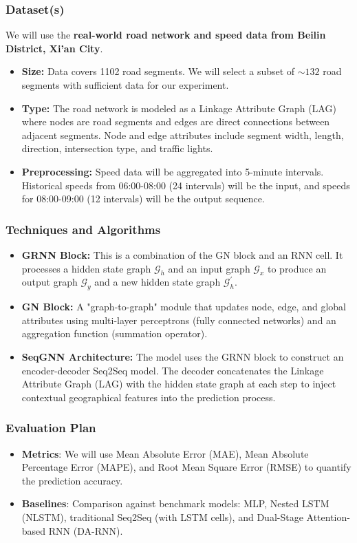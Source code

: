 \documentclass[11pt, a4paper]{article}
\begin{document}
\subsubsection*{Dataset(s)}
We will use the \textbf{real-world road network and speed data from Beilin District, Xi'an City}.
\begin{itemize}
    \item \textbf{Size:} Data covers 1102 road segments. We will select a subset of $\sim 132$ road segments with sufficient data for our experiment.
    \item \textbf{Type:} The road network is modeled as a Linkage Attribute Graph (LAG) where nodes are road segments and edges are direct connections between adjacent segments. Node and edge attributes include segment width, length, direction, intersection type, and traffic lights.
    \item \textbf{Preprocessing:} Speed data will be aggregated into 5-minute intervals. Historical speeds from 06:00-08:00 (24 intervals) will be the input, and speeds for 08:00-09:00 (12 intervals) will be the output sequence.
\end{itemize}

\subsubsection*{Techniques and Algorithms}
\begin{itemize}
    \item \textbf{GRNN Block:} This is a combination of the GN block and an RNN cell. It processes a hidden state graph $\mathcal{G}_{h}$ and an input graph $\mathcal{G}_{x}$ to produce an output graph $\mathcal{G}_{y}$ and a new hidden state graph $\mathcal{G}_{h}^{\prime}$.
    \item \textbf{GN Block:} A "graph-to-graph" module that updates node, edge, and global attributes using multi-layer perceptrons (fully connected networks) and an aggregation function (summation operator).
    \item \textbf{SeqGNN Architecture:} The model uses the GRNN block to construct an encoder-decoder Seq2Seq model. The decoder concatenates the Linkage Attribute Graph (LAG) with the hidden state graph at each step to inject contextual geographical features into the prediction process.
\end{itemize}

\subsubsection*{Evaluation Plan}
\begin{itemize}
    \item \textbf{Metrics}: We will use Mean Absolute Error (MAE), Mean Absolute Percentage Error (MAPE), and Root Mean Square Error (RMSE) to quantify the prediction accuracy.
    \item \textbf{Baselines}: Comparison against benchmark models: MLP, Nested LSTM (NLSTM), traditional Seq2Seq (with LSTM cells), and Dual-Stage Attention-based RNN (DA-RNN).
\end{itemize}
\end{document}
